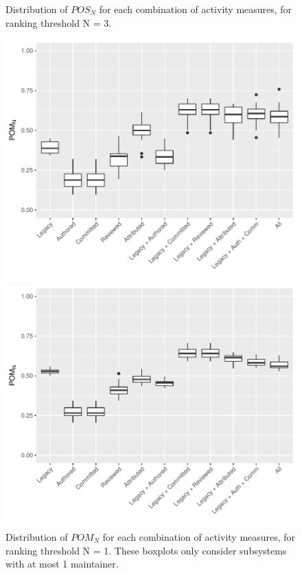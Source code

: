 \begin{figure}[t]
\begin{minipage}[b]{\columnwidth}
    \caption{Distribution of $POS_N$ for each combination of activity measures, for ranking threshold N = 3. }
    \label{fig:rq2_3}
  \end{minipage}
\end{figure}

\begin{figure}[t]
  \centering
  \begin{minipage}[b]{\columnwidth}
    \centering
    \includegraphics[scale=.5]{plots/RQ2_metrics_N1_many_maint}
    \caption{Distribution of $POM_N$ for each combination of activity measures, for ranking threshold N = 1. These boxplots only consider subsystems with at most 1 maintainer.}
    \label{fig:rq2_1_many}
  \end{minipage}
  \begin{minipage}[b]{\columnwidth}
    \centering
    \includegraphics[scale=.5]{plots/RQ2_metrics_N3_many_maint}

\end{minipage}
\end{figure}
